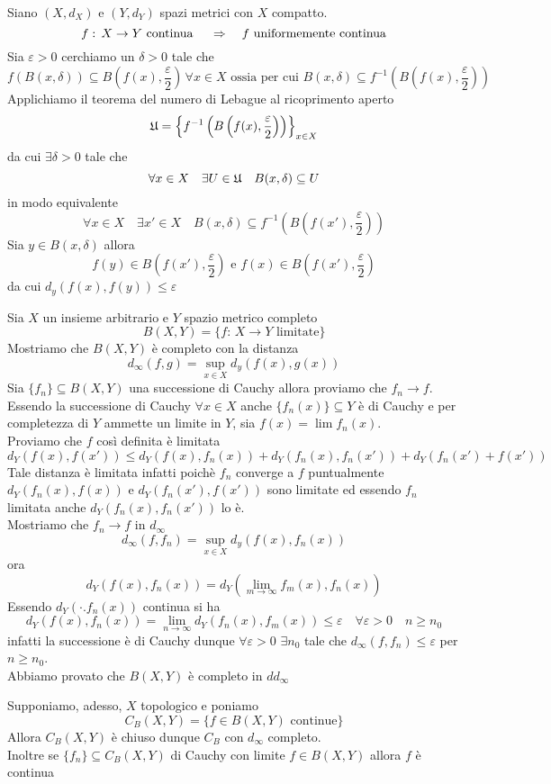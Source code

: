 \begin{thm}\bianco
Siano $(X,d_X)$ e $(Y,d_Y)$ spazi metrici con $X$ compatto.
$$f:\, X \to Y \text{ continua } \quad \Rightarrow \quad f \text{ uniformemente continua}$$
\proof Sia $\varepsilon>0$ cerchiamo un $\delta>0$ tale che 
$$f(B(x, \delta))\subseteq B\left( f(x), \frac{\varepsilon}{2}\right) \,  \forall x \in X \text{  ossia per cui } B(x,\delta)\subseteq f^{-1}\left( B \left( f(x), \frac{\varepsilon}{2}\right)\right)$$
Applichiamo il teorema del numero di Lebague al ricoprimento aperto 
$$ \mathfrak{U} = \left\{ f^{-1} \left( B \left( f(x) , \frac{\varepsilon}{2}\right)\right)\right\}_{x \in X }$$
da cui $\exists \delta>0$ tale che $$\forall x \in X \quad \exists U \in \mathfrak{U} \quad B(x,\delta)\subseteq U$$ in modo equivalente $$\forall x \in X\quad  \exists x' \in X   \quad B(x,\delta) \subseteq f^{-1}\left( B \left( f(x'),\frac{\varepsilon}{2}\right)\right)$$
Sia $y \in B(x,\delta)$ allora 
$$ f(y) \in B \left( f(x'), \frac{\varepsilon}{2}\right) \text{ e } f(x) \in B \left( f(x'), \frac{\varepsilon}{2}\right) $$ 
da cui $d_y(f(x), f(y) ) \leq \varepsilon$\endproof
\end{thm}\newpage

Sia $X$ un insieme arbitrario e $Y$ spazio metrico completo
$$ B(X,Y)=\{ f:\, X \to Y \text{ limitate}\}$$
Mostriamo che $B(X,Y)$ \`e completo con la distanza $$d_\infty( f, g) =\sup_{x\in X } d_y (f(x),g(x))$$
Sia $\{ f_n\} \subseteq B(X,Y)$ una successione di Cauchy allora proviamo che $f_n \to f $.\\
Essendo la successione di Cauchy $\forall x \in X $ anche $\{f_n(x)\}\subseteq Y$ \`e di Cauchy e per completezza di $Y$ ammette un limite in $Y$, sia $f(x)=\lim f_n(x)$.\\
Proviamo che $f$ cos\`i definita \`e limitata
$$ d_Y(f(x),f(x'))  \leq d_Y(f(x), f_n(x))+ d_Y(f_n(x),f_n(x'))+ d_Y(f_n(x')+f(x')) $$
Tale distanza \`e limitata infatti  poich\`e $f_n$ converge a $f$ puntualmente $d_Y(f_n(x),f(x))$ e $d_Y(f_n(x'),f(x'))$ sono limitate ed essendo $f_n$ limitata anche $d_Y(f_n(x),f_n(x'))$ lo \`e.\\
Mostriamo che $f_n \to f$ in $d_\infty$
$$ d_\infty(f,f_n) = \sup_{x\in X} d_y(f(x), f_n(x))$$
ora 
$$ d_Y(f(x), f_n(x))= d_Y \left( \lim_{m \to \infty} f_m (x),f_n(x) \right)$$
Essendo $d_Y(\cdot. f_n(x))$ continua si ha 
$$ d_Y(f(x),f_n(x)) = \lim_{n \to \infty} d_Y(f_n(x),f_m(x)) \leq\varepsilon \quad \forall \varepsilon>0 \quad n \geq n_0$$
infatti la successione \`e di Cauchy dunque $\forall \varepsilon>0 $ $\exists n_0$ tale che $d_\infty(f,f_n)\leq \varepsilon$ per $n \geq n_0$.\\
Abbiamo provato che $B(X,Y)$ \`e completo in $dd_\infty$
\begin{ex}
Supponiamo, adesso, $X$ topologico e poniamo 
$$ C_B(X,Y)=\{ f \in B(X,Y) \text{ continue}\}$$
Allora 
$C_B(X,Y)$ \`e chiuso dunque $C_B$ con $d_\infty$ completo.\\
Inoltre se $\{ f_n\} \subseteq C_B(X,Y)$ di Cauchy con limite $f \in B(X,Y)$ allora $f$ \`e continua
\end{ex}
